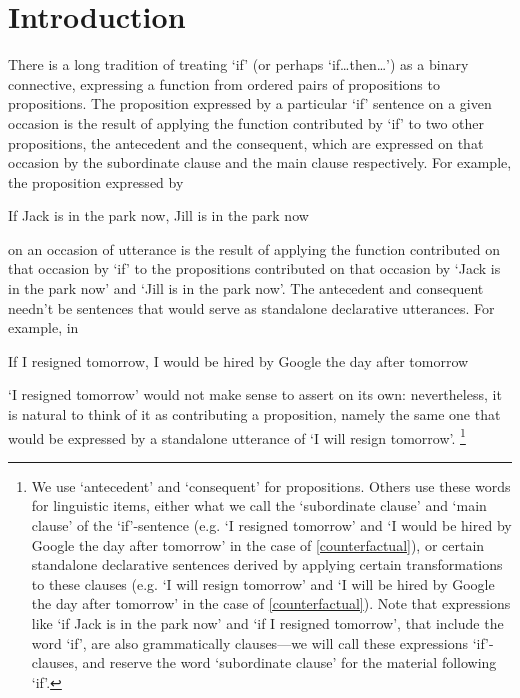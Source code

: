 \documentclass[If.tex]{subfiles}
\begin{document}
 
\chapter*{Introduction}  
There is a long tradition of treating ‘if’ (or perhaps ‘if\ldots then\ldots’) as a binary connective, expressing a function from ordered pairs of propositions to propositions. The proposition expressed by a particular ‘if’ sentence on a given occasion is the result of applying the function contributed by ‘if’ to two other propositions, the antecedent and the consequent, which are expressed on that occasion by the  subordinate clause and the main clause respectively. For example, the proposition expressed by
\begin{prop}
	\nitem \label{indicative} 
	If Jack is in the park now, Jill is in the park now
\end{prop}
on an occasion of utterance is the result of applying the function contributed on that occasion by ‘if’ to the propositions contributed on that occasion by ‘Jack is in the park now’ and ‘Jill is in the park now’. The antecedent and consequent needn't be sentences that would serve as standalone declarative utterances. For example, in
\begin{prop}
	\nitem \label{counterfactual} 
	If I resigned tomorrow, I would be hired by Google the day after tomorrow
\end{prop}
‘I resigned tomorrow’ would not make sense to assert on its own: nevertheless, it is natural to think of it as contributing a proposition, namely the same one that would be expressed by a standalone utterance of ‘I will resign tomorrow’.%
\footnote{We use ‘antecedent’ and ‘consequent’ for propositions. Others use these words for linguistic items, either what we call the ‘subordinate clause’ and ‘main clause’ of the ‘if’-sentence (e.g. ‘I resigned tomorrow’ and ‘I would be hired by Google the day after tomorrow’ in the case of \ref{counterfactual}), or certain standalone declarative sentences derived by applying certain transformations to these clauses (e.g. ‘I will resign tomorrow’ and ‘I will be hired by Google the day after tomorrow’ in the case of \ref{counterfactual}).  Note that expressions like ‘if Jack is in the park now’ and ‘if I resigned tomorrow’, that include the word ‘if’, are also grammatically clauses---we will call these expressions ‘if’-clauses, and reserve the word ‘subordinate clause’ for the material following ‘if’.}
\end{document}
